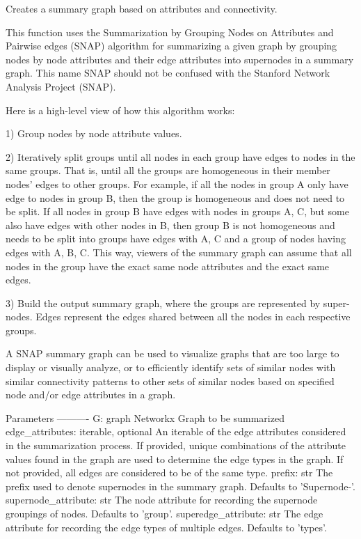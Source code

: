 \begin{DoxyVerb}Creates a summary graph based on attributes and connectivity.

This function uses the Summarization by Grouping Nodes on Attributes
and Pairwise edges (SNAP) algorithm for summarizing a given
graph by grouping nodes by node attributes and their edge attributes
into supernodes in a summary graph.  This name SNAP should not be
confused with the Stanford Network Analysis Project (SNAP).

Here is a high-level view of how this algorithm works:

1) Group nodes by node attribute values.

2) Iteratively split groups until all nodes in each group have edges
to nodes in the same groups. That is, until all the groups are homogeneous
in their member nodes' edges to other groups.  For example,
if all the nodes in group A only have edge to nodes in group B, then the
group is homogeneous and does not need to be split. If all nodes in group B
have edges with nodes in groups {A, C}, but some also have edges with other
nodes in B, then group B is not homogeneous and needs to be split into
groups have edges with {A, C} and a group of nodes having
edges with {A, B, C}.  This way, viewers of the summary graph can
assume that all nodes in the group have the exact same node attributes and
the exact same edges.

3) Build the output summary graph, where the groups are represented by
super-nodes. Edges represent the edges shared between all the nodes in each
respective groups.

A SNAP summary graph can be used to visualize graphs that are too large to display
or visually analyze, or to efficiently identify sets of similar nodes with similar connectivity
patterns to other sets of similar nodes based on specified node and/or edge attributes in a graph.

Parameters
----------
G: graph
    Networkx Graph to be summarized
edge_attributes: iterable, optional
    An iterable of the edge attributes considered in the summarization process.  If provided, unique
    combinations of the attribute values found in the graph are used to
    determine the edge types in the graph.  If not provided, all edges
    are considered to be of the same type.
prefix: str
    The prefix used to denote supernodes in the summary graph. Defaults to 'Supernode-'.
supernode_attribute: str
    The node attribute for recording the supernode groupings of nodes. Defaults to 'group'.
superedge_attribute: str
    The edge attribute for recording the edge types of multiple edges. Defaults to 'types'.


\end{DoxyVerb}
